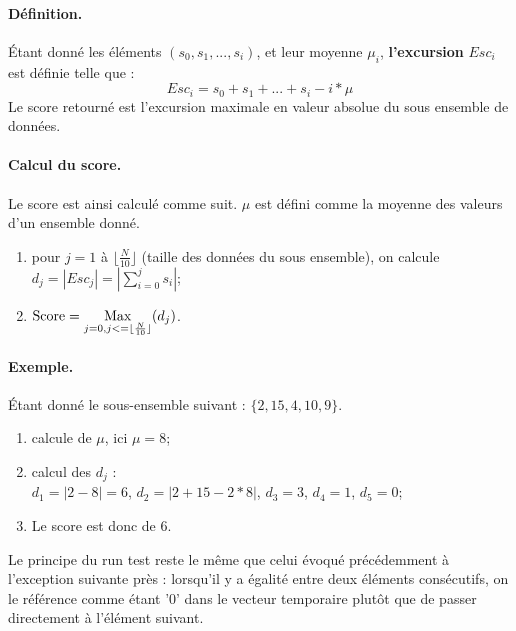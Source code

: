 \paragraph{Définition.\\}
 Étant donné les éléments $(s_0,s_1,...,s_i)$, et leur moyenne $\mu_i$, \textbf{l'excursion} $Esc_i$ est définie telle que :
 $$ Esc_i= s_0+ s_1 + ... + s_i - i*\mu$$ 
Le score retourné est l'excursion maximale en valeur absolue du sous ensemble de données. \\

\paragraph{Calcul du score.\\}
Le score est ainsi calculé comme suit. $\mu$ est défini comme la moyenne des valeurs d'un ensemble donné.
\begin{enumerate}
\item pour $j=1$ à $ \lfloor\frac{N}{10}\rfloor$ (taille des données du sous ensemble), on calcule $d_j=|Esc_j| = |\sum\limits_{i=0}^{j} s_i|$;
\item $\text{Score} = \operatorname*{Max}\limits_{j=0,j<=\lfloor\frac{N}{10}\rfloor} (d_j)$.\\
\end{enumerate}

\paragraph{Exemple.\\}
Étant donné le sous-ensemble suivant : $ \lbrace 2, 15, 4, 10, 9 \rbrace$. 
\begin{enumerate}
\item calcule de $\mu$, ici $\mu=8$;
\item calcul des $d_j$ :\\
$d_1=|2-8|=6$, $d_2=|2+15-2*8|$, $d_3=3$, $d_4=1$, $d_5=0$;
\item Le score est donc de $6$.\\
\end{enumerate}

Le principe du run test reste le même que celui évoqué précédemment à l'exception suivante près : lorsqu'il y a égalité entre deux éléments consécutifs, on le référence comme étant '0' dans le vecteur temporaire plutôt que de passer directement à l'élément suivant. 

